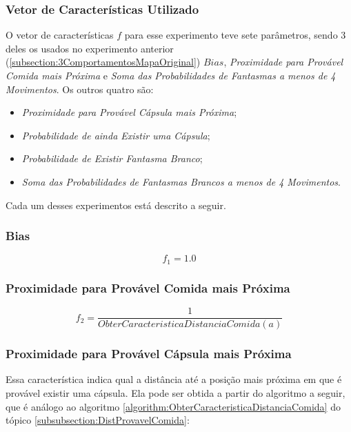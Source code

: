 \subsubsection{Vetor de Características Utilizado} \label{subsubsection:5ComportamentosVetorCaracterísticas}

O vetor de características $ f $ para esse experimento teve sete parâmetros, sendo 3 deles os usados no experimento anterior (\ref{subsection:3ComportamentosMapaOriginal}) $ Bias $, \textit{Proximidade para Provável Comida mais Próxima} e \textit{Soma das Probabilidades de Fantasmas a menos de 4 Movimentos}. Os outros quatro são:

\begin{itemize}
	\item \textit{Proximidade para Provável Cápsula mais Próxima};
	\item \textit{Probabilidade de ainda Existir uma Cápsula};
	\item \textit{Probabilidade de Existir Fantasma Branco};
	\item \textit{Soma das Probabilidades de Fantasmas Brancos a menos de 4 Movimentos}.
\end{itemize}

Cada um desses experimentos está descrito a seguir.

\subsubsection*{Bias}
$$ f_1 = 1.0 $$

\subsubsection*{Proximidade para Provável Comida mais Próxima}
$$ f_2 = \frac{1}{ObterCaracteristicaDistanciaComida \left( a \right)} $$

\subsubsection*{Proximidade para Provável Cápsula mais Próxima}

Essa característica indica qual a distância até a posição mais próxima em que é provável existir uma cápsula. Ela pode ser obtida a partir do algoritmo a seguir, que é análogo ao algoritmo \ref{algorithm:ObterCaracteristicaDistanciaComida} do tópico \ref{subsubsection:DistProvavelComida}:

